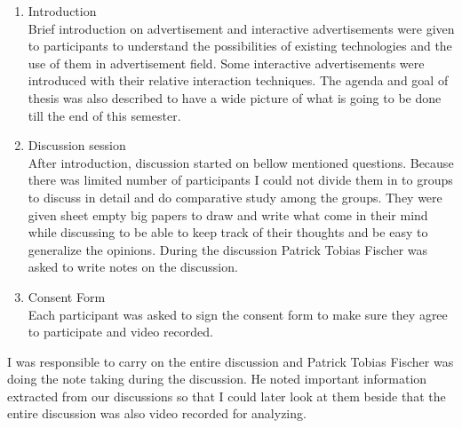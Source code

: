 \begin{enumerate}
\item Introduction \\
Brief introduction on advertisement and interactive advertisements were given to participants to understand the possibilities of existing technologies and the use of them in advertisement field. Some interactive advertisements were introduced with their relative interaction techniques. The agenda and goal of thesis was also described to have a wide picture of what is going to be done till the end of this semester.


\item Discussion session \\
After introduction, discussion started on bellow mentioned questions. Because there was limited number of participants I could not divide them in to groups to discuss in detail and do comparative study among the groups. They were given sheet empty big papers to draw and write what come in their mind while discussing to be able to keep track of their thoughts and be easy to generalize the opinions. During the discussion Patrick Tobias Fischer was asked to write notes on the discussion.

\item Consent Form \\
Each participant was asked to sign the consent form to make sure they agree to participate and video recorded.

\end{enumerate}


I was responsible to carry on the entire discussion and Patrick Tobias Fischer was doing the note taking during the discussion. He noted important information extracted from our discussions so that I could later look at them beside that the entire discussion was also video recorded for analyzing.



